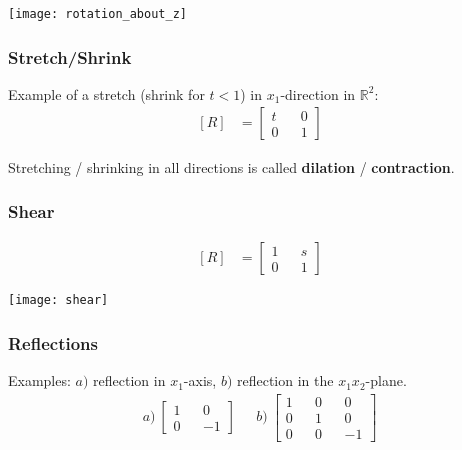 \documentclass[a4paper,9pt]{extarticle}
\begin{document}
\begin{multicols*}{2}
{\centering \texttt{[image: rotation\_about\_z]} \par}


\subsubsection{Stretch/Shrink}
Example of a stretch (shrink for $t < 1$) in $x_1$-direction in $\mathbb{R}^2$:
\begin{equation} \label{3.3-4}
    \begin{split}
        [R] & = \begin{bmatrix}t && 0 \\ 0 && 1\end{bmatrix}
    \end{split}
\end{equation}

Stretching / shrinking in all directions is called \textbf{dilation} / \textbf{contraction}.


\subsubsection{Shear}
\begin{equation} \label{3.3-5}
    \begin{split}
        [R] & = \begin{bmatrix}1 && s \\ 0 && 1\end{bmatrix}
    \end{split}
\end{equation}

{\centering \texttt{[image: shear]} \par}


\subsubsection{Reflections}
Examples: $a)$ reflection in $x_1$-axis, $b)$ reflection in the $x_1 x_2$-plane.
\begin{equation} \label{3.3-6}
    \begin{split}
        a) \> \begin{bmatrix}1 && 0 \\ 0 && -1\end{bmatrix}& \>\>\> b) \> \begin{bmatrix}1 && 0 && 0 \\ 0 && 1 && 0 \\ 0 && 0 && -1\end{bmatrix}
    \end{split}
\end{equation}


\end{multicols*}
\end{document}
